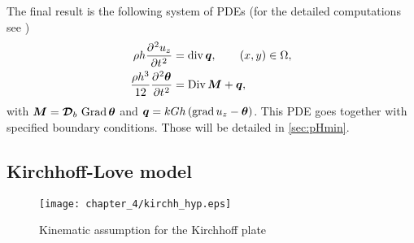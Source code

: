 The final result is the following system of PDEs (for the detailed computations see \cite[Chapter 10]{reddy2006theory})
\begin{equation}\label{eq:classMin}
\begin{aligned}
\rho h \diffp[2]{u_z}{t} &= \div \bm{q}, \qquad (x,y) \in \Omega, \\
\frac{\rho h^3}{12} \diffp[2]{\bm{\theta}}{t} &=\Div \bm{M} + \bm{q},
\end{aligned}
\end{equation}
with $\bm{M}= \bm{\mathcal{D}}_b\,\operatorname*{Grad}{\bm{\theta}}$ and $\bm{q}= kGh\,(\operatorname*{grad} u_z - \bm{\theta})$. This PDE goes together with specified boundary conditions. Those will be detailed in \ref{sec:pHmin}.


\subsection{Kirchhoff-Love model}
\begin{figure}[tb]
	\centering
	\texttt{[image: chapter\_4/kirchh\_hyp.eps]}
	\caption{Kinematic assumption for the Kirchhoff plate}
	\label{fig:kirchh_hyp}
\end{figure}

